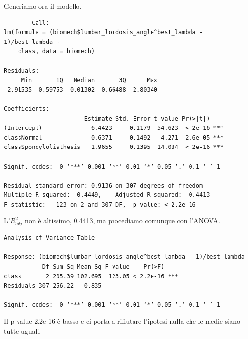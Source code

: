 \documentclass{beamer}
\newcommand{\fg}[2]{%
  \begin{center}
      \texttt{[image: \#2]}%
  \end{center}
}
\begin{document}
\begin{frame}[fragile]
	Generiamo ora il modello.
	{\tiny
	\begin{verbatim}
		Call:
lm(formula = (biomech$lumbar_lordosis_angle^best_lambda - 1)/best_lambda ~ 
    class, data = biomech)

Residuals:
     Min       1Q   Median       3Q      Max 
-2.91535 -0.59753  0.01302  0.66488  2.80340 

Coefficients:
                       Estimate Std. Error t value Pr(>|t|)    
(Intercept)              6.4423     0.1179  54.623  < 2e-16 ***
classNormal              0.6371     0.1492   4.271  2.6e-05 ***
classSpondylolisthesis   1.9655     0.1395  14.084  < 2e-16 ***
---
Signif. codes:  0 ‘***’ 0.001 ‘**’ 0.01 ‘*’ 0.05 ‘.’ 0.1 ‘ ’ 1

Residual standard error: 0.9136 on 307 degrees of freedom
Multiple R-squared:  0.4449,	Adjusted R-squared:  0.4413 
F-statistic:   123 on 2 and 307 DF,  p-value: < 2.2e-16
	\end{verbatim}
	}
\end{frame}

\begin{frame}[fragile]
	L'$R^{2}_{adj}$ non è altissimo, 0.4413, ma procediamo comunque con l'ANOVA.

	{\tiny
	\begin{verbatim}
Analysis of Variance Table

Response: (biomech$lumbar_lordosis_angle^best_lambda - 1)/best_lambda
           Df Sum Sq Mean Sq F value    Pr(>F)    
class       2 205.39 102.695  123.05 < 2.2e-16 ***
Residuals 307 256.22   0.835                      
---
Signif. codes:  0 ‘***’ 0.001 ‘**’ 0.01 ‘*’ 0.05 ‘.’ 0.1 ‘ ’ 1
	\end{verbatim}
	}

	Il p-value 2.2e-16 è basso e ci porta a rifiutare l'ipotesi nulla che le medie siano tutte uguali.
\end{frame}


\end{document}
